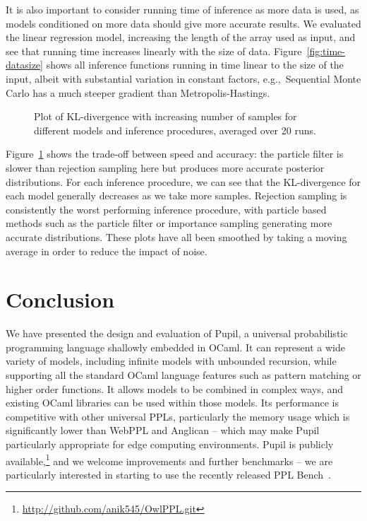 \documentclass[sigconf]{acmart}
\newcommand{\pupil}{Pupil\xspace}
\begin{document}
It is also important to consider running time of inference as more data is used, as  models conditioned on more data should  give more accurate results. We evaluated  the linear regression model, increasing the length of the array used as input, and see that running time increases linearly with the size of data. Figure~\ref{fig:time-datasize} shows all inference functions running in time linear to the size of the input, albeit with substantial variation in constant factors, e.g.,~Sequential Monte Carlo has a much steeper gradient than Metropolis-Hastings.

\begin{figure}
  \centering
  
  \caption{\label{fig:kl}
    Plot of KL-divergence with increasing number of samples for different models and inference procedures, averaged over 20 runs. %
  }
\end{figure}

Figure~\ref{fig:kl} shows the trade-off between speed and accuracy: the particle filter is slower than rejection sampling here but produces more accurate posterior distributions. For each inference procedure, we can see that the KL-divergence for each model generally decreases as we take more samples. Rejection sampling is consistently the worst performing inference procedure, with particle based methods such as the particle filter or importance sampling generating more accurate distributions. These plots have all been smoothed by taking a moving average in order to reduce the impact of noise.

\section{Conclusion}
\label{s:conclusion}

We have presented the design and evaluation of \pupil, a universal probabilistic programming language shallowly embedded in OCaml. It can represent a wide variety of models, including infinite models with unbounded recursion, while supporting all the standard OCaml language features such as pattern matching or higher order functions. It allows models to be combined in complex ways, and existing OCaml libraries can be used within those models. Its performance is competitive with other universal PPLs, particularly the memory usage which is significantly lower than WebPPL and Anglican -- which may make \pupil particularly appropriate for edge computing environments. \pupil is publicly available,\footnote{\url{http://github.com/anik545/OwlPPL.git}} and we welcome improvements and further benchmarks -- we are particularly interested in starting to use the recently released PPL Bench~\cite{pplbench}.


{
  
  
}
\end{document}
